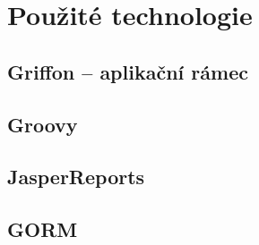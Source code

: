 \chapter{Použité technologie}

\section{Griffon -- aplikační rámec}

\section{Groovy}

\section{JasperReports}

\section{GORM}


